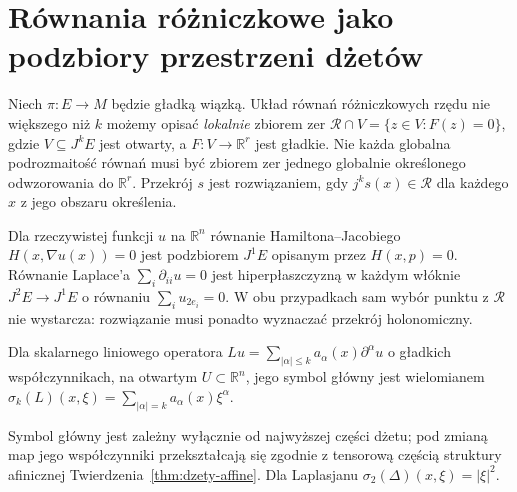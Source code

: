 \section{Równania różniczkowe jako podzbiory przestrzeni dżetów}
\begin{definicja}
\label{def:dzety-pde}
Niech $\pi:E\to M$ będzie gładką wiązką.
Układ równań różniczkowych rzędu nie większego niż $k$
możemy opisać \emph{lokalnie} zbiorem zer
$\mathcal R\cap V=\{z\in V:F(z)=0\}$, gdzie
$V\subseteq J^kE$ jest otwarty, a
$F:V\to\mathbb R^r$ jest gładkie. Nie każda globalna
podrozmaitość równań musi być zbiorem zer jednego
globalnie określonego odwzorowania do $\mathbb R^r$.
Przekrój $s$ jest rozwiązaniem, gdy $j^ks(x)\in\mathcal R$
dla każdego $x$ z jego obszaru określenia.
\end{definicja}

\begin{przyklad}
Dla rzeczywistej funkcji $u$ na $\mathbb R^n$
równanie Hamiltona--Jacobiego
$H(x,\nabla u(x))=0$ jest podzbiorem $J^1E$
opisanym przez $H(x,p)=0$. Równanie Laplace'a
$\sum_i\partial_{ii}u=0$ jest hiperpłaszczyzną
w każdym włóknie $J^2E\to J^1E$ o równaniu
$\sum_i u_{2e_i}=0$. W obu przypadkach sam wybór
punktu z $\mathcal R$ nie wystarcza: rozwiązanie
musi ponadto wyznaczać przekrój holonomiczny.
\end{przyklad}

\begin{definicja}
\label{def:dzety-symbol}
Dla skalarnego liniowego operatora
$Lu=\sum_{|\alpha|\le k}a_\alpha(x)\partial^\alpha u$
o gładkich współczynnikach, na otwartym $U\subset\mathbb R^n$,
jego symbol główny jest wielomianem
$\sigma_k(L)(x,\xi)=\sum_{|\alpha|=k}a_\alpha(x)\xi^\alpha$.
\end{definicja}

\begin{uwaga}
Symbol główny jest zależny wyłącznie od najwyższej części
dżetu; pod zmianą map jego współczynniki przekształcają się
zgodnie z tensorową częścią struktury afinicznej
Twierdzenia~\ref{thm:dzety-affine}. Dla Laplasjanu
$\sigma_2(\Delta)(x,\xi)=|\xi|^2$.
\end{uwaga}

